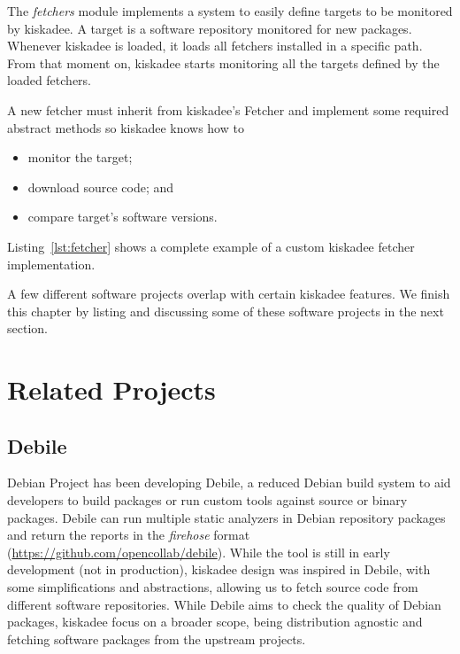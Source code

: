 The \emph{fetchers} module implements a system to easily define targets to be
monitored by kiskadee. A target is a software repository monitored for new
packages. Whenever kiskadee is loaded, it loads all fetchers installed in a
specific path. From that moment on, kiskadee starts monitoring all the targets
defined by the loaded fetchers.

A new fetcher must inherit from kiskadee's Fetcher and implement some required
abstract methods so kiskadee knows how to
\begin{itemize}
  \item monitor the target;
  \item download source code; and
  \item compare target's software versions.
\end{itemize}

Listing~\ref{lst:fetcher} shows a complete example of a custom kiskadee fetcher implementation.

\begin{minipage}{\linewidth}

\end{minipage}

A few different software projects overlap with certain kiskadee features. We
finish this chapter by listing and discussing some of these software projects
in the next section.

\section{Related Projects}
\label{sec:related_projects}

\subsection{Debile}

Debian Project has been developing Debile, a reduced Debian build system to aid
developers to build packages or run custom tools against source or binary
packages.  Debile can run multiple static analyzers in Debian repository
packages and return the reports in the \textit{firehose}
format (\url{https://github.com/opencollab/debile}). While the tool is
still in early development (not in production), kiskadee design was inspired in
Debile, with some simplifications and abstractions, allowing us to fetch source
code from different software repositories. While Debile aims to check the
quality of Debian packages, kiskadee focus on a broader scope, being
distribution agnostic and fetching software packages from the upstream projects.

